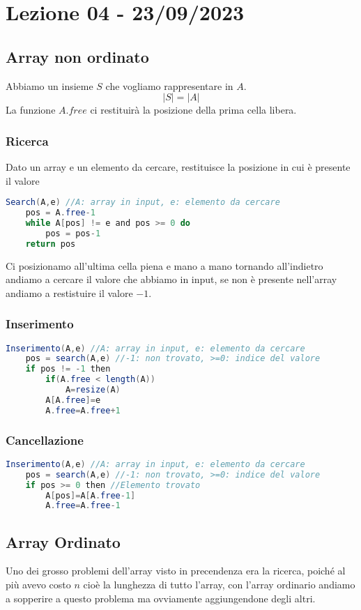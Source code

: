 \section{Lezione 04 - 23/09/2023}
\subsection{Array non ordinato}
Abbiamo un insieme $S$ che vogliamo rappresentare in $A$.\\
$$ |S| = |A| $$
La funzione $A.free$ ci restituirà la posizione della prima cella libera.\\


\subsubsection{Ricerca}
Dato un array e un elemento da cercare, restituisce la posizione in cui è presente il valore
\begin{lstlisting}[language=Java]
Search(A,e) //A: array in input, e: elemento da cercare
	pos = A.free-1
	while A[pos] != e and pos >= 0 do
		pos = pos-1
	return pos
\end{lstlisting}
Ci posizionamo all'ultima cella piena e mano a mano tornando all'indietro andiamo a cercare il valore che abbiamo in input, se non è presente nell'array andiamo a restistuire il valore $-1$. 

\subsubsection{Inserimento}
\begin{lstlisting}[language=Java]
Inserimento(A,e) //A: array in input, e: elemento da cercare
	pos = search(A,e) //-1: non trovato, >=0: indice del valore
	if pos != -1 then
		if(A.free < length(A))
			A=resize(A)
		A[A.free]=e
		A.free=A.free+1
\end{lstlisting}

\subsubsection{Cancellazione}
\begin{lstlisting}[language=Java]
Inserimento(A,e) //A: array in input, e: elemento da cercare
	pos = search(A,e) //-1: non trovato, >=0: indice del valore
	if pos >= 0 then //Elemento trovato
		A[pos]=A[A.free-1]
		A.free=A.free-1
\end{lstlisting}

\subsection{Array Ordinato}
Uno dei grosso problemi dell'array visto in precendenza era la ricerca, poiché al più avevo costo $n$ cioè la lunghezza di tutto l'array, con l'array ordinario andiamo a sopperire a questo problema ma ovviamente aggiungendone degli altri.

